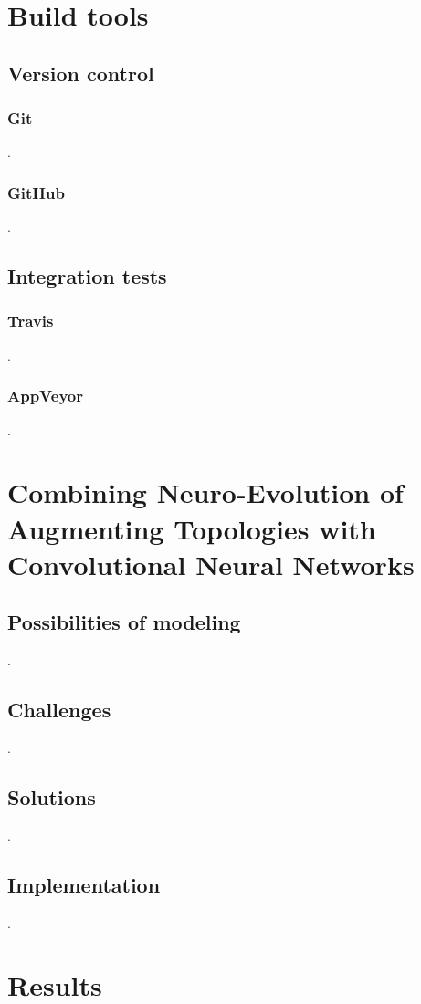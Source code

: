 \documentclass[11pt]{article}
\begin{document}
	\section{Build tools}
		\subsection{Version control}
			\subsubsection{Git}
				.
			\subsubsection{GitHub}
				.
		\subsection{Integration tests}
			\subsubsection{Travis}
				.
			\subsubsection{AppVeyor}
				.
	\newpage

	\section{Combining Neuro-Evolution of Augmenting Topologies with Convolutional Neural Networks}
		\subsection{Possibilities of modeling}
			.
		\subsection{Challenges}
			.
		\subsection{Solutions}
			.
		\subsection{Implementation}
			.
	\newpage

	\section{Results}
\end{document}
